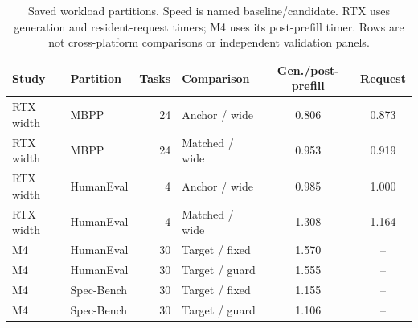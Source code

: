 \begin{table}[t]\centering\footnotesize\setlength{\tabcolsep}{4pt}
\caption{Saved workload partitions. Speed is named baseline/candidate. RTX uses generation and resident-request timers; M4 uses its post-prefill timer. Rows are not cross-platform comparisons or independent validation panels.}
\label{tab:strata}
\begin{tabular}{llrlcc}\toprule
Study & Partition & Tasks & Comparison & Gen./post-prefill & Request\\\midrule
RTX width & MBPP & 24 & Anchor / wide & 0.806 & 0.873\\
RTX width & MBPP & 24 & Matched / wide & 0.953 & 0.919\\
RTX width & HumanEval & 4 & Anchor / wide & 0.985 & 1.000\\
RTX width & HumanEval & 4 & Matched / wide & 1.308 & 1.164\\
M4 & HumanEval & 30 & Target / fixed & 1.570 & --\\
M4 & HumanEval & 30 & Target / guard & 1.555 & --\\
M4 & Spec-Bench & 30 & Target / fixed & 1.155 & --\\
M4 & Spec-Bench & 30 & Target / guard & 1.106 & --\\
\bottomrule\end{tabular}\end{table}
